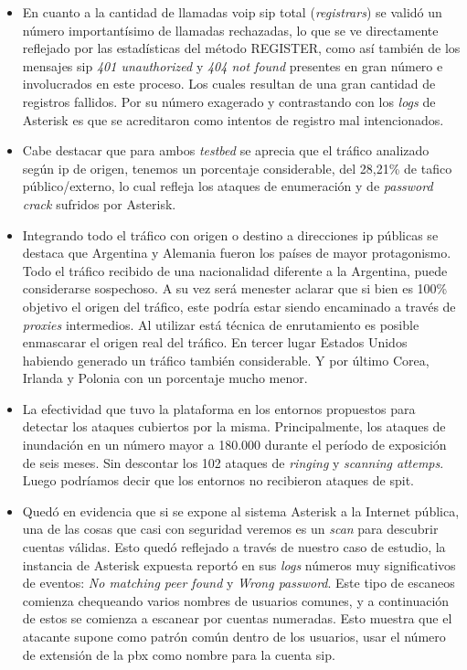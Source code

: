 \documentclass[a4paper,12pt]{report}
\begin{document}
{\begin{itemize}
\item{En cuanto a la cantidad de llamadas \ac{voip} \ac{sip} total (\emph{registrars})
se validó un número importantísimo de llamadas rechazadas, lo que se ve directamente
reflejado por las estadísticas del método REGISTER, como así también de los mensajes \ac{sip}
\emph{401 unauthorized} y \emph{404 not found} presentes en gran número e involucrados en este proceso. 
Los cuales resultan de una gran cantidad de registros fallidos. Por su número exagerado y \mbox{contrastando}
con los \emph{logs} de Asterisk es que se acreditaron como intentos de
registro mal intencionados.}

\item{Cabe destacar que para ambos \emph{testbed} se aprecia que el
tráfico analizado según \ac{ip} de origen, tenemos un
porcentaje considerable, del 28,21\% de tafico público/externo, lo cual
refleja los ataques de enumeración y de \emph{password crack} sufridos por Asterisk.}

\item{Integrando todo el tráfico con origen o destino a direcciones \ac{ip} públicas
se destaca que Argentina y Alemania fueron los países de mayor
protagonismo. Todo el tráfico recibido de una
nacionalidad diferente a la Argentina, puede considerarse sospechoso. A su vez
será menester aclarar que si bien es 100\% objetivo el origen del tráfico, este
podría estar siendo encaminado a través de \emph{proxies} intermedios. Al utilizar
está técnica de enrutamiento es posible enmascarar el origen real del tráfico.
En tercer lugar Estados Unidos habiendo generado un tráfico también
considerable. Y por último Corea, Irlanda y Polonia con un porcentaje mucho
menor.}

\item{La efectividad que tuvo la plataforma en los entornos propuestos 
para detectar los ataques cubiertos por la misma. Principalmente, los ataques de inundación 
en un número mayor a 180.000 durante el período de exposición de seis meses. Sin descontar 
los 102 ataques de \emph{ringing} y \emph{scanning attemps}. Luego podríamos decir que los entornos no 
recibieron ataques de \ac{spit}.}

\item{Quedó en evidencia que si se expone al sistema Asterisk a la Internet pública, una de las
cosas que casi con seguridad veremos es un \emph{scan} para descubrir cuentas válidas. 
Esto quedó reflejado a través de nuestro caso de estudio, la instancia de Asterisk expuesta
reportó en sus \emph{logs} números muy significativos
de eventos: \emph{No matching peer found} y \emph{Wrong password}.
Este tipo de escaneos comienza chequeando varios nombres de
usuarios comunes, y a continuación de estos se comienza a escanear por cuentas \mbox{numeradas}. Esto muestra que
el atacante supone como patrón común dentro de los usuarios, usar el número de extensión de la \ac{pbx} como 
nombre para la cuenta \ac{sip}}.


\end{itemize}}
\end{document}
